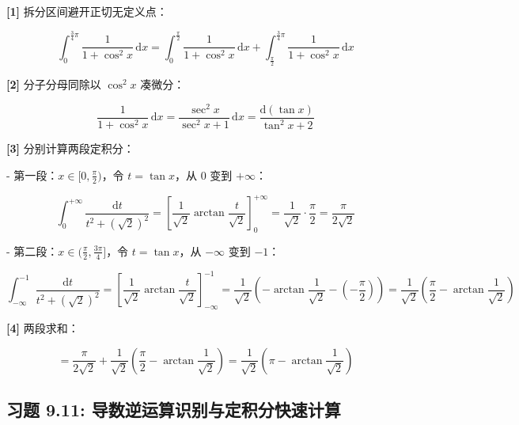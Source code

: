 \documentclass[11pt,a4paper,UTF8]{ctexart}
\begin{document}
\begin{solbox}[分步推导与答题规范]
\textbf{[1]} 拆分区间避开正切无定义点：


\begin{equation*}
\int_0^{\frac{3}{4}\pi} \frac{1}{1+\cos^2 x}\,\mathrm{d}x = \int_0^{\frac{\pi}{2}} \frac{1}{1+\cos^2 x}\,\mathrm{d}x + \int_{\frac{\pi}{2}}^{\frac{3}{4}\pi} \frac{1}{1+\cos^2 x}\,\mathrm{d}x
\end{equation*}


\textbf{[2]} 分子分母同除以 $\cos^2 x$ 凑微分：


\begin{equation*}
\frac{1}{1+\cos^2 x}\,\mathrm{d}x = \frac{\sec^2 x}{\sec^2 x + 1}\,\mathrm{d}x = \frac{\mathrm{d}(\tan x)}{\tan^2 x + 2}
\end{equation*}


\textbf{[3]} 分别计算两段定积分：

- 第一段：$x \in [0, \frac{\pi}{2})$，令 $t = \tan x$，从 $0$ 变到 $+\infty$：


\begin{equation*}
\int_0^{+\infty} \frac{\mathrm{d}t}{t^2 + (\sqrt{2})^2} = \left[ \frac{1}{\sqrt{2}}\arctan\frac{t}{\sqrt{2}} \right]_0^{+\infty} = \frac{1}{\sqrt{2}} \cdot \frac{\pi}{2} = \frac{\pi}{2\sqrt{2}}
\end{equation*}


- 第二段：$x \in (\frac{\pi}{2}, \frac{3\pi}{4}]$，令 $t = \tan x$，从 $-\infty$ 变到 $-1$：


\begin{equation*}
\int_{-\infty}^{-1} \frac{\mathrm{d}t}{t^2 + (\sqrt{2})^2} = \left[ \frac{1}{\sqrt{2}}\arctan\frac{t}{\sqrt{2}} \right]_{-\infty}^{-1} = \frac{1}{\sqrt{2}}\left(-\arctan\frac{1}{\sqrt{2}} - \left(-\frac{\pi}{2}\right)\right) = \frac{1}{\sqrt{2}}\left(\frac{\pi}{2} - \arctan\frac{1}{\sqrt{2}}\right)
\end{equation*}


\textbf{[4]} 两段求和：


\begin{equation*}
= \frac{\pi}{2\sqrt{2}} + \frac{1}{\sqrt{2}}\left(\frac{\pi}{2} - \arctan\frac{1}{\sqrt{2}}\right) = \frac{1}{\sqrt{2}}\left(\pi - \arctan\frac{1}{\sqrt{2}}\right)
\end{equation*}

\end{solbox}


\subsection{习题 9.11: 导数逆运算识别与定积分快速计算}
\end{document}
